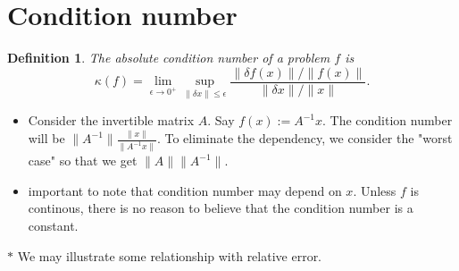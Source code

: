 \documentclass[11pt,reqno]{amsart}
\newtheorem{definition}{Definition}
\theoremstyle{remark}
\begin{document}
\section{Condition number}
\begin{definition}
The absolute condition number of a problem $f$ is
\[
\kappa(f) = \lim_{{\epsilon \to 0^+}} \sup_{{\lVert\delta x\rVert \leq \epsilon}} \frac{\lVert\delta f(x)\rVert / \lVert f(x)\rVert}{\lVert \delta x\rVert / \lVert x\rVert}.
\]
\end{definition}
\begin{itemize}
\item Consider the invertible matrix $A$. Say $f(x):=A^{-1}x$. The condition number will be $\lVert A^{-1}\rVert\frac{\lVert x\rVert}{\lVert A^{-1}x\rVert}$. To eliminate the dependency, we 
consider the "worst case" so that we get $\lVert A\rVert\lVert A^{-1}\rVert$.
\item important to note that condition number may depend on $x$. Unless $f$ is continous, there is no reason to believe that the condition number is a constant.
\end{itemize}
$\ast$ We may illustrate some relationship with relative error.
\end{document}
